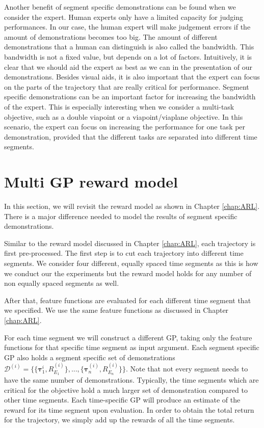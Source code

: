 \documentclass[mscThesis.tex]{subfiles}
\begin{document}
Another benefit of segment specific demonstrations can be found when we consider the expert. Human experts only have a limited capacity for judging performances. In our case, the human expert will make judgement errors if the amount of demonstrations becomes too big. The amount of different demonstrations that a human can distinguish is also called the bandwidth. This bandwidth is not a fixed value, but depends on a lot of factors. Intuitively, it is clear that we should aid the expert as best as we can in the presentation of our demonstrations. Besides visual aids, it is also important that the expert can focus on the parts of the trajectory that are really critical for performance. Segment specific demonstrations can be an important factor for increasing the bandwidth of the expert. This is especially interesting when we consider a multi-task objective, such as a double viapoint or a viapoint/viaplane objective. In this scenario, the expert can focus on increasing the performance for one task per demonstration, provided that the different tasks are separated into different time segments.  

\section{Multi GP reward model}
\label{sec:rm-ext}
In this section, we will revisit the reward model as shown in Chapter \ref{chap:ARL}. There is a major difference needed to model the results of segment specific demonstrations. 

Similar to the reward model discussed in Chapter \ref{chap:ARL}, each trajectory is first pre-processed. The first step is to cut each trajectory into different time segments. We consider four different, equally spaced time segments as this is how we conduct our the experiments but the reward model holds for any number of non equally spaced segments as well. 

After that, feature functions are evaluated for each different time segment that we specified. We use the same feature functions as discussed in Chapter \ref{chap:ARL}.

For each time segment we will construct a different GP, taking only the feature functions for that specific time segment as input argument. Each segment specific GP also holds a segment specific set of demonstrations $\mathcal{D}^{(i)} = \{ \{\bm{\tau}^{i}_1, R^{(i)}_{E_1}\}, ..., \{ \bm{\tau}^{(i)}_n, R^{(i)}_{E_n} \} \}$. Note that not every segment needs to have the same number of demonstrations. Typically, the time segments which are critical for the objective hold a much larger set of demonstration compared to other time segments. Each time-specific GP will produce an estimate of the reward for its time segment upon evaluation. In order to obtain the total return for the trajectory, we simply add up the rewards of all the time segments.
\end{document}
